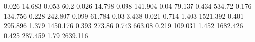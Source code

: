 0.026      14.683     %
0.053      60.2       %
0.026      14.798     %
0.098      141.904    %
0.04       79.137     %
0.434      534.72     %
0.176      134.756    %
0.228      242.807    %
0.099      61.784     %
0.03       3.438      %
0.021      0.714      %
1.403      1521.392   %
0.401      295.896    %
1.379      1450.176   %
0.393      273.86     %
0.743      663.08     %
0.219      109.031    %
1.452      1682.426   %
0.425      287.459    %
1.79       2639.116   %
